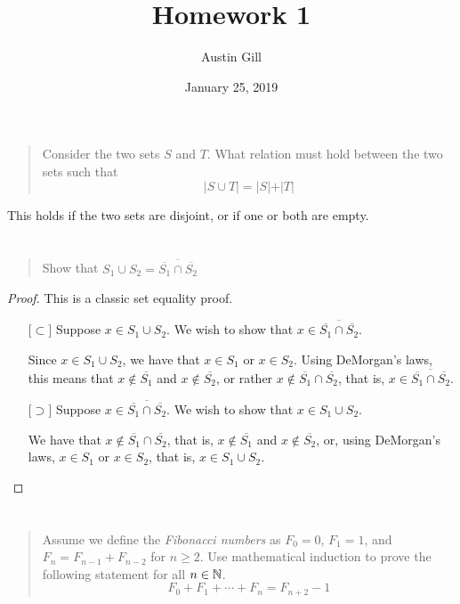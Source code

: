 \documentclass{article}
\title{Homework 1}
\author{Austin Gill}
\date{January 25, 2019}
\begin{document}
\maketitle

\section{}
\begin{quote}
    Consider the two sets $S$ and $T$. What relation must hold between the
    two sets such that
    \[\vert S \cup T \vert = \vert S \vert + \vert T \vert \]
\end{quote}
This holds if the two sets are disjoint, or if one or both are empty.

\section{}
\begin{quote}
    Show that $S_1 \cup S_2 = \overline{\overline{S_1} \cap \overline{S_2}}$
\end{quote}

\begin{proof}
    This is a classic set equality proof.
    \begin{itemize}
        \item[$\lbrack\subset\rbrack$] Suppose $x \in S_1 \cup S_2$. We wish to show that $x \in
                  \overline{\overline{S_1} \cap \overline{S_2}}$.

              Since $x \in S_1 \cup S_2$, we have that $x \in S_1$ or $x \in S_2$. Using
              DeMorgan's laws, this means that $x \notin \overline{S_1}$ and
              $x \notin \overline{S_2}$, or rather $x \notin \overline{S_1} \cap \overline{S_2}$,
              that is, $x \in \overline{\overline{S_1} \cap \overline{S_2}}$.
        \item[$\lbrack\supset\rbrack$] Suppose $x \in \overline{\overline{S_1} \cap
                      \overline{S_2}}$. We wish to show that $x \in S_1 \cup S_2$.

              We have that $x \notin \overline{S_1} \cap \overline{S_2}$, that is, $x \notin
                  \overline{S_1}$ and $x \notin \overline{S_2}$, or, using DeMorgan's laws,
              $x \in S_1$ or $x \in S_2$, that is, $x \in S_1 \cup S_2$.
    \end{itemize}
\end{proof}

\section{}
\begin{quote}
    Assume we define the \textit{Fibonacci numbers} as $F_0 = 0$, $F_1 = 1$,
    and $F_n = F_{n-1} + F_{n-2}$ for $n \geq 2$. Use mathematical induction to
    prove the following statement for all $n \in \mathbb{N}$.
    \[F_0 + F_1 + \cdots + F_n = F_{n + 2} - 1\]
\end{quote}
\end{document}
